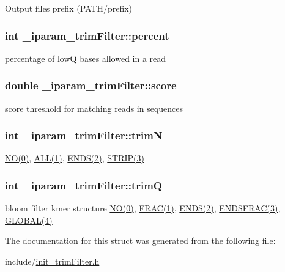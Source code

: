 Output files prefix (P\+A\+T\+H/prefix) \hypertarget{struct__iparam__trimFilter_a8ed026b1de4fccc7288258c3a8faa395}{
\subsubsection[{percent}]{\setlength{\rightskip}{0pt plus 5cm}int \+\_\+iparam\+\_\+trim\+Filter\+::percent}}\label{struct__iparam__trimFilter_a8ed026b1de4fccc7288258c3a8faa395}
percentage of low\+Q bases allowed in a read \hypertarget{struct__iparam__trimFilter_a193ef2030f6eb8db0b75afbbd152d6a1}{
\subsubsection[{score}]{\setlength{\rightskip}{0pt plus 5cm}double \+\_\+iparam\+\_\+trim\+Filter\+::score}}\label{struct__iparam__trimFilter_a193ef2030f6eb8db0b75afbbd152d6a1}
score threshold for matching reads in sequences \hypertarget{struct__iparam__trimFilter_a5f2d247cc26608ed5cc9e2d6943940d7}{
\subsubsection[{trim\+N}]{\setlength{\rightskip}{0pt plus 5cm}int \+\_\+iparam\+\_\+trim\+Filter\+::trim\+N}}\label{struct__iparam__trimFilter_a5f2d247cc26608ed5cc9e2d6943940d7}
\hyperlink{defines_8h_a996bde01ecac342918f0a2c4e7ce7bd5}{N\+O(0)}, \hyperlink{defines_8h_a1edd1ea8bddaf4d9c5eb3eae1ee1726a}{A\+L\+L(1)}, \hyperlink{defines_8h_a052e72209cfac2ff9aa78294f0bebea8}{E\+N\+D\+S(2)}, \hyperlink{defines_8h_a53529d9638a1d70f6e5989dedf4c2672}{S\+T\+R\+I\+P(3)} \hypertarget{struct__iparam__trimFilter_a5b5344041c9313230de07c9485227203}{
\subsubsection[{trim\+Q}]{\setlength{\rightskip}{0pt plus 5cm}int \+\_\+iparam\+\_\+trim\+Filter\+::trim\+Q}}\label{struct__iparam__trimFilter_a5b5344041c9313230de07c9485227203}
bloom filter kmer structure \hyperlink{defines_8h_a996bde01ecac342918f0a2c4e7ce7bd5}{N\+O(0)}, \hyperlink{defines_8h_a653af6bd29f56a2699de26a928820da7}{F\+R\+A\+C(1)}, \hyperlink{defines_8h_a052e72209cfac2ff9aa78294f0bebea8}{E\+N\+D\+S(2)}, \hyperlink{defines_8h_abf0b71573c7ffc4f6746c24c9abc202a}{E\+N\+D\+S\+F\+R\+A\+C(3)}, \hyperlink{defines_8h_a3de33738fd3c7e77bffbcfaefc3e7645}{G\+L\+O\+B\+A\+L(4)} 

The documentation for this struct was generated from the following file\+:\begin{DoxyCompactItemize}
\item 
include/\hyperlink{init__trimFilter_8h}{init\+\_\+trim\+Filter.\+h}\end{DoxyCompactItemize}
